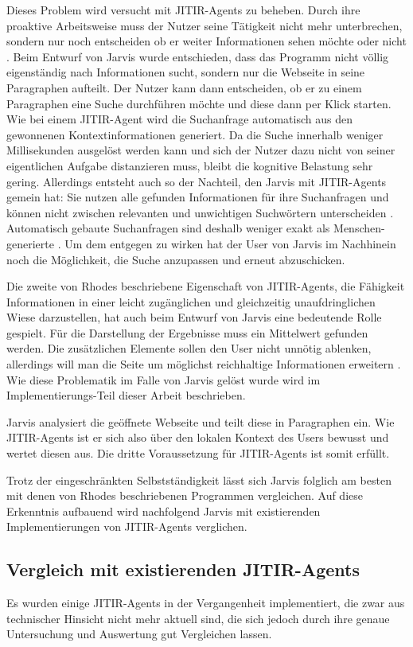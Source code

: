 Dieses Problem wird versucht mit JITIR-Agents zu beheben. Durch ihre proaktive Arbeitsweise muss der Nutzer seine Tätigkeit nicht mehr unterbrechen, sondern nur noch entscheiden ob er weiter Informationen sehen möchte oder nicht \cite{rhodes2000just}. Beim Entwurf von Jarvis wurde entschieden, dass das Programm nicht völlig eigenständig nach Informationen sucht, sondern nur die Webseite in seine Paragraphen aufteilt. Der Nutzer kann dann entscheiden, ob er zu einem Paragraphen eine Suche durchführen möchte und diese dann per Klick starten. Wie bei einem JITIR-Agent wird die Suchanfrage automatisch aus den gewonnenen Kontextinformationen generiert. Da die Suche innerhalb weniger Millisekunden ausgelöst werden kann und sich der Nutzer dazu nicht von seiner eigentlichen Aufgabe distanzieren muss, bleibt die kognitive Belastung sehr gering. Allerdings entsteht auch so der Nachteil, den Jarvis mit JITIR-Agents gemein hat: Sie nutzen alle gefunden Informationen für ihre Suchanfragen und können nicht zwischen relevanten und unwichtigen Suchwörtern unterscheiden \cite{rhodes2000margin}. Automatisch gebaute Suchanfragen sind deshalb weniger exakt als Menschen-generierte \cite{rhodes2000just}. Um dem entgegen zu wirken hat der User von Jarvis im Nachhinein noch die Möglichkeit, die Suche anzupassen und erneut abzuschicken.

Die zweite von Rhodes beschriebene Eigenschaft von JITIR-Agents, die Fähigkeit Informationen in einer leicht zugänglichen und gleichzeitig unaufdringlichen Wiese darzustellen, hat auch beim Entwurf von Jarvis eine bedeutende Rolle gespielt. Für die Darstellung der Ergebnisse muss ein Mittelwert gefunden werden. Die zusätzlichen Elemente sollen den User nicht unnötig ablenken, allerdings will man die Seite um möglichst reichhaltige Informationen erweitern \cite{rhodes2000margin}. Wie diese Problematik im Falle von Jarvis gelöst wurde wird im Implementierungs-Teil dieser Arbeit beschrieben.

Jarvis analysiert die geöffnete Webseite und teilt diese in Paragraphen ein. Wie JITIR-Agents ist er sich also über den lokalen Kontext des Users bewusst und wertet diesen aus. Die dritte Voraussetzung für JITIR-Agents ist somit erfüllt.

Trotz der eingeschränkten Selbstständigkeit lässt sich Jarvis folglich am besten mit denen von Rhodes beschriebenen Programmen vergleichen. Auf diese Erkenntnis aufbauend wird nachfolgend Jarvis mit existierenden Implementierungen von JITIR-Agents verglichen.

\subsection{Vergleich mit existierenden JITIR-Agents}
Es wurden einige JITIR-Agents in der Vergangenheit implementiert, die zwar aus technischer Hinsicht nicht mehr aktuell sind, die sich jedoch durch ihre genaue Untersuchung und Auswertung gut Vergleichen lassen.

